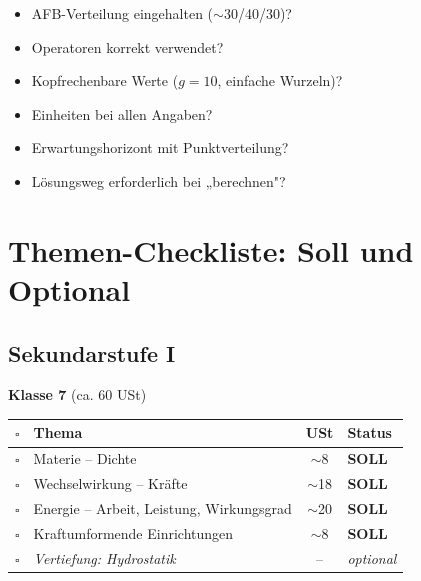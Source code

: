 \documentclass[11pt,a4paper]{article}
\newcommand{\checkbox}{$\square$}
\begin{document}
\vspace{0.5cm}

\begin{checklistbox}
\begin{itemize}[leftmargin=0.5cm, label=\checkbox]
\item AFB-Verteilung eingehalten ($\sim$30/40/30)?
\item Operatoren korrekt verwendet?
\item Kopfrechenbare Werte ($g = 10$, einfache Wurzeln)?
\item Einheiten bei allen Angaben?
\item Erwartungshorizont mit Punktverteilung?
\item Lösungsweg erforderlich bei „berechnen"?
\end{itemize}
\end{checklistbox}

\newpage
\section{Themen-Checkliste: Soll und Optional}

\subsection{Sekundarstufe I}

\begin{center}
\textbf{Klasse 7} (ca. 60 USt)
\end{center}

\begin{tabularx}{\textwidth}{c|l|c|X}
\rowcolor{lightblue}
\checkbox & \textbf{Thema} & \textbf{USt} & \textbf{Status} \\
\hline
\checkbox & Materie -- Dichte & $\sim$8 & \textbf{SOLL} \\
\rowcolor{lightgray}
\checkbox & Wechselwirkung -- Kräfte & $\sim$18 & \textbf{SOLL} \\
\checkbox & Energie -- Arbeit, Leistung, Wirkungsgrad & $\sim$20 & \textbf{SOLL} \\
\rowcolor{lightgray}
\checkbox & Kraftumformende Einrichtungen & $\sim$8 & \textbf{SOLL} \\
\checkbox & \textit{Vertiefung: Hydrostatik} & -- & \textit{optional} \\
\hline
\end{tabularx}
\end{document}
